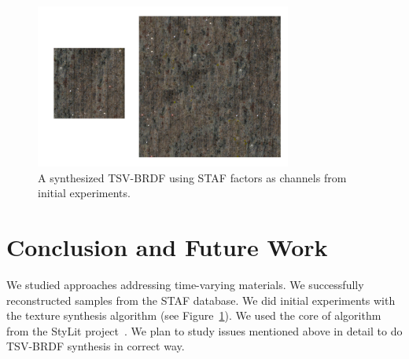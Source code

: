 \documentclass[11pt]{article}
\begin{document}
\begin{figure}[htb] 
\begin{center}
\includegraphics[width=0.75\textwidth]{figures/granite}
\end{center}
\caption{A synthesized TSV-BRDF using STAF factors as channels from initial experiments.}
\label{Fig:Granite}
\end{figure}

\section{Conclusion and Future Work}
We studied approaches addressing time-varying materials. We successfully reconstructed samples from the STAF database. We did initial experiments with the texture synthesis algorithm (see Figure~\ref{Fig:Granite}). We used the core of algorithm from the StyLit project~\cite{Fiser2016}. We plan to study issues mentioned above in detail to do TSV-BRDF synthesis in correct way. 



\end{document}
